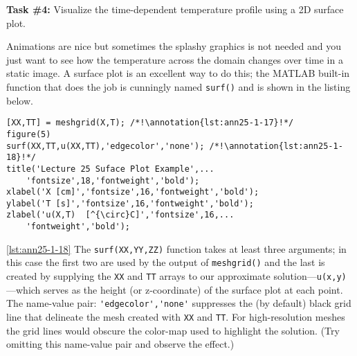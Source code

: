 \vspace{0.25cm}
\setcounter{lstannotation}{0} %
\noindent\textbf{Task \#4: } Visualize the time-dependent temperature profile using a 2D surface plot.

\vspace{0.15cm}

\noindent Animations are nice but sometimes the splashy graphics is not needed and you just want to see how the temperature across the domain changes over time in a static image.  A surface plot is an excellent way to do this; the MATLAB built-in function that does the job is cunningly named \lstinline[style=myMatlab]{surf()} and is shown in the listing below.
\begin{lstlisting}[style=myMatlab, name=lec25-ex1]
%% Plot the temperature vs time in a 2D plot using the surf function
[XX,TT] = meshgrid(X,T); /*!\annotation{lst:ann25-1-17}!*/
figure(5)
surf(XX,TT,u(XX,TT),'edgecolor','none'); /*!\annotation{lst:ann25-1-18}!*/
title('Lecture 25 Suface Plot Example',...
    'fontsize',18,'fontweight','bold');
xlabel('X [cm]','fontsize',16,'fontweight','bold');
ylabel('T [s]','fontsize',16,'fontweight','bold');
zlabel('u(X,T)  [^{\circ}C]','fontsize',16,...
    'fontweight','bold');
\end{lstlisting}

\vspace{0.2cm}

\ref{lst:ann25-1-18} The \lstinline[style=myMatlab]{surf(XX,YY,ZZ)} function takes at least three arguments; in this case the first two are used by the output of \lstinline[style=myMatlab]{meshgrid()} and the last is created by supplying the \lstinline{XX} and \lstinline{TT} arrays to our approximate solution---\lstinline{u(x,y)}---which serves as the height (or z-coordinate) of the surface plot at each point. The name-value pair: \lstinline{'edgecolor','none'} suppresses the (by default) black grid line that delineate the mesh created with \lstinline{XX} and \lstinline{TT}.  For high-resolution meshes the grid lines would obscure the color-map used to highlight the solution. (Try omitting this name-value pair and observe the effect.)

